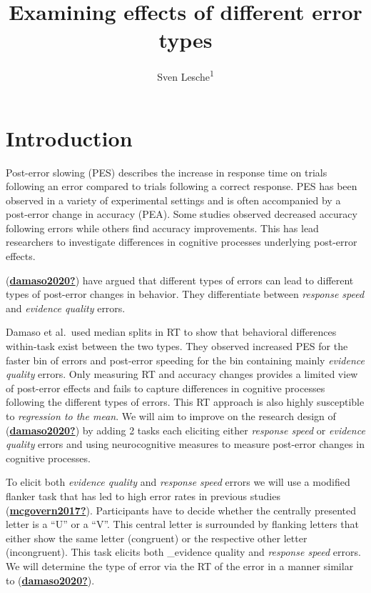 \documentclass[
  man,floatsintext]{apa7}
\title{Examining effects of different error types}
\author{Sven Lesche\textsuperscript{1}}
\date{}
\affiliation{\vspace{0.5cm}\textsuperscript{1} Ruprecht-Karls-University Heidelberg}
\begin{document}
\maketitle

\hypertarget{introduction}{%
\section{Introduction}\label{introduction}}

Post-error slowing (PES) describes the increase in response time on trials following an error compared to trials following a correct response. PES has been observed in a variety of experimental settings and is often accompanied by a post-error change in accuracy (PEA). Some studies observed decreased accuracy following errors while others find accuracy improvements. This has lead researchers to investigate differences in cognitive processes underlying post-error effects.

(\protect\hyperlink{ref-damaso2020}{\textbf{damaso2020?}}) have argued that different types of errors can lead to different types of post-error changes in behavior. They differentiate between \emph{response speed} and \emph{evidence quality} errors.

Damaso et al.~used median splits in RT to show that behavioral differences within-task exist between the two types. They observed increased PES for the faster bin of errors and post-error speeding for the bin containing mainly \emph{evidence quality} errors. Only measuring RT and accuracy changes provides a limited view of post-error effects and fails to capture differences in cognitive processes following the different types of errors. This RT approach is also highly susceptible to \emph{regression to the mean}. We will aim to improve on the research design of (\protect\hyperlink{ref-damaso2020}{\textbf{damaso2020?}}) by adding 2 tasks each eliciting either \emph{response speed} or \emph{evidence quality} errors and using neurocognitive measures to measure post-error changes in cognitive processes.

To elicit both \emph{evidence quality} and \emph{response speed} errors we will use a modified flanker task that has led to high error rates in previous studies (\protect\hyperlink{ref-mcgovern2017}{\textbf{mcgovern2017?}}). Participants have to decide whether the centrally presented letter is a ``U'' or a ``V''. This central letter is surrounded by flanking letters that either show the same letter (congruent) or the respective other letter (incongruent). This task elicits both \_evidence quality and \emph{response speed} errors. We will determine the type of error via the RT of the error in a manner similar to (\protect\hyperlink{ref-damaso2020}{\textbf{damaso2020?}}).
\end{document}
